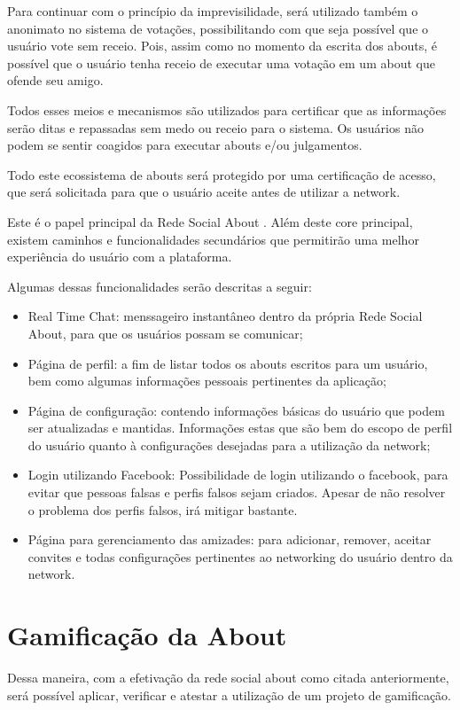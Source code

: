 Para continuar com o princípio da imprevisilidade, será utilizado também o anonimato no sistema de votações, possibilitando
com que seja possível que o usuário vote sem receio. Pois, assim como no momento da escrita dos abouts, é possível que o 
usuário tenha receio de executar uma votação em um about que ofende seu amigo.

Todos esses meios e mecanismos são utilizados para certificar que as informações serão ditas e repassadas sem medo
ou receio para o sistema. Os usuários não podem se sentir coagidos para executar abouts e/ou julgamentos. 

Todo este ecossistema de abouts será protegido por uma certificação de acesso, que será solicitada para que o usuário
aceite antes de utilizar a network.

Este é o papel principal da Rede Social About . Além deste core principal, existem caminhos e funcionalidades
secundários  que permitirão uma melhor experiência do usuário com a plataforma.

Algumas dessas funcionalidades serão descritas a seguir:

\begin{itemize}
    \item Real Time Chat: menssageiro instantâneo dentro da própria Rede Social About, para que os usuários possam se
        comunicar;
    \item Página de perfil: a fim de listar todos os abouts escritos para um usuário, bem como algumas informações
        pessoais pertinentes da aplicação;
    \item Página de configuração: contendo informações básicas do usuário que podem ser atualizadas e mantidas.
        Informações estas que são bem do escopo de perfil do usuário quanto à configurações desejadas
        para a utilização da network;
    \item Login utilizando Facebook: Possibilidade de login utilizando o facebook, para evitar que pessoas
        falsas e perfis falsos sejam criados. Apesar de não resolver o problema dos perfis falsos,
        irá mitigar bastante.
    \item Página para gerenciamento das amizades: para adicionar, remover, aceitar convites e todas configurações
        pertinentes ao networking do usuário dentro da network.
\end{itemize}

\section{Gamificação da About}
\label{sub:gamification}
Dessa maneira, com a efetivação da rede social about como citada anteriormente, será possível aplicar, verificar e
atestar a utilização de um projeto de gamificação.

